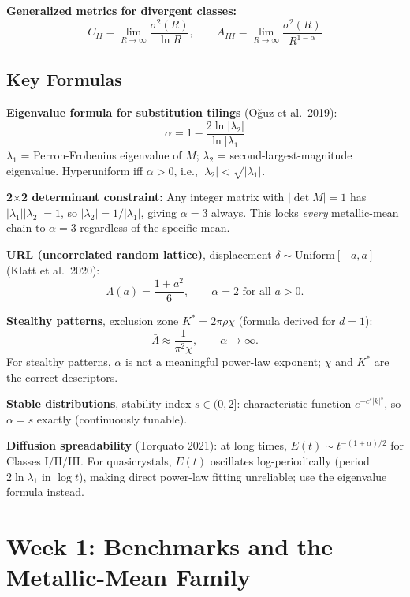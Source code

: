 \documentclass[11pt,letterpaper]{article}
\begin{document}
\medskip
\textbf{Generalized metrics for divergent classes:}
\[
C_{II} = \lim_{R\to\infty}\frac{\sigma^2(R)}{\ln R}, \qquad
A_{III} = \lim_{R\to\infty}\frac{\sigma^2(R)}{R^{1-\alpha}}
\]

\subsection{Key Formulas}

\textbf{Eigenvalue formula for substitution tilings} (Oğuz et al.\ 2019):
\[
\boxed{\alpha = 1 - \frac{2\ln|\lambda_2|}{\ln|\lambda_1|}}
\]
$\lambda_1$ = Perron-Frobenius eigenvalue of $M$; $\lambda_2$ = second-largest-magnitude eigenvalue.
Hyperuniform iff $\alpha > 0$, i.e., $|\lambda_2| < \sqrt{|\lambda_1|}$.

\medskip
\textbf{2$\times$2 determinant constraint:} Any integer matrix with $|\det M| = 1$ has
$|\lambda_1||\lambda_2| = 1$, so $|\lambda_2| = 1/|\lambda_1|$, giving $\alpha = 3$ always.
This locks \emph{every} metallic-mean chain to $\alpha = 3$ regardless of the specific mean.

\medskip
\textbf{URL (uncorrelated random lattice)}, displacement $\delta \sim \mathrm{Uniform}[-a,a]$
(Klatt et al.\ 2020):
\[
\bar{\Lambda}(a) = \frac{1+a^2}{6}, \qquad \alpha = 2 \text{ for all } a>0.
\]

\textbf{Stealthy patterns}, exclusion zone $K^* = 2\pi\rho\chi$ (formula derived for $d=1$):
\[
\bar{\Lambda} \approx \frac{1}{\pi^2\chi}, \qquad \alpha\to\infty.
\]
For stealthy patterns, $\alpha$ is not a meaningful power-law exponent; $\chi$ and $K^*$ are
the correct descriptors.

\medskip
\textbf{Stable distributions}, stability index $s\in(0,2]$:
characteristic function $e^{-c^s|k|^s}$, so $\alpha = s$ exactly (continuously tunable).

\medskip
\textbf{Diffusion spreadability} (Torquato 2021): at long times,
$E(t) \sim t^{-(1+\alpha)/2}$ for Classes I/II/III.
For quasicrystals, $E(t)$ oscillates log-periodically (period $2\ln\lambda_1$ in $\log t$),
making direct power-law fitting unreliable; use the eigenvalue formula instead.

\section{Week 1: Benchmarks and the Metallic-Mean Family}
\end{document}
